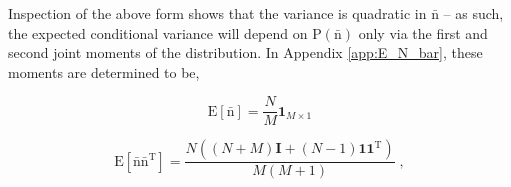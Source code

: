 \documentclass[12pt]{report}
\begin{document}
%
%
%
%
%

Inspection of the above form shows that the variance is quadratic in $\bar{\bm{\mathrm{n}}}$ -- as such, the expected conditional variance will depend on $\text{P}(\bar{\bm{\mathrm{n}}})$ only via the first and second joint moments of the distribution. In Appendix \ref{app:E_N_bar}, these moments are determined to be,

\begin{equation}
\text{E}[\bar{\bm{\mathrm{n}}}] = \frac{N}{M} \bm{1}_{M \times 1}
\end{equation}

\begin{equation}
\text{E}[\bar{\bm{\mathrm{n}}} \bar{\bm{\mathrm{n}}}^\text{T}] = \frac{N \left( (N+M)\textbf{I} + (N-1)\bm{1}\bm{1}^\text{T} \right)}{M(M+1)} \;,
\end{equation}
\end{document}
